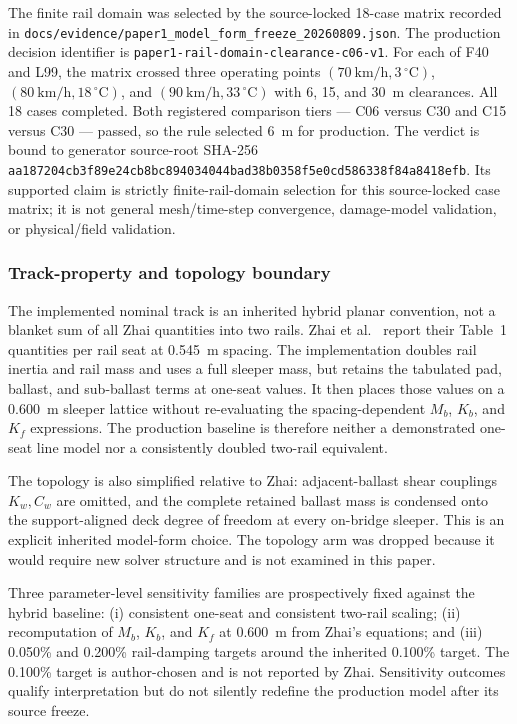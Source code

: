 The finite rail domain was selected by the source-locked 18-case matrix recorded
in \nolinkurl{docs/evidence/paper1_model_form_freeze_20260809.json}. The
production decision identifier is
\nolinkurl{paper1-rail-domain-clearance-c06-v1}.
For each of F40 and L99, the matrix crossed three operating points
$(70~\mathrm{km/h},3\,^{\circ}\mathrm{C})$,
$(80~\mathrm{km/h},18\,^{\circ}\mathrm{C})$, and
$(90~\mathrm{km/h},33\,^{\circ}\mathrm{C})$ with 6, 15, and 30~m clearances.
All 18 cases completed. Both registered comparison tiers --- C06 versus C30
and C15 versus C30 --- passed, so the rule selected 6~m for production. The
verdict is bound to generator source-root SHA-256
\nolinkurl{aa187204cb3f89e24cb8bc894034044bad38b0358f5e0cd586338f84a8418efb}.
Its supported claim is strictly finite-rail-domain selection for this
source-locked case matrix; it is not general mesh/time-step convergence,
damage-model validation, or physical/field validation.

\subsubsection{Track-property and topology boundary}
\label{sec:track_boundary}

The implemented nominal track is an inherited hybrid planar convention, not a
blanket sum of all Zhai quantities into two rails. Zhai et
al.~\cite{zhai2004track} report their Table~1 quantities per rail seat at
0.545~m spacing. The implementation doubles rail inertia and rail mass and uses
a full sleeper mass, but retains the tabulated pad, ballast, and sub-ballast
terms at one-seat values. It then places those values on a 0.600~m sleeper
lattice without re-evaluating the spacing-dependent $M_b$, $K_b$, and $K_f$
expressions. The production baseline is therefore neither a demonstrated
one-seat line model nor a consistently doubled two-rail equivalent.

The topology is also simplified relative to Zhai: adjacent-ballast shear
couplings $K_w,C_w$ are omitted, and the complete retained ballast mass is
condensed onto the support-aligned deck degree of freedom at every on-bridge
sleeper. This is an explicit inherited model-form choice. The topology arm was
dropped because it would require new solver structure and is not examined in
this paper.

Three parameter-level sensitivity families are prospectively fixed against the
hybrid baseline: (i) consistent one-seat and consistent two-rail scaling;
(ii) recomputation of $M_b$, $K_b$, and $K_f$ at 0.600~m from Zhai's equations;
and (iii) 0.050\% and 0.200\% rail-damping targets around the inherited 0.100\%
target. The 0.100\% target is author-chosen and is not reported by Zhai.
Sensitivity outcomes qualify interpretation but do not silently redefine the
production model after its source freeze.


